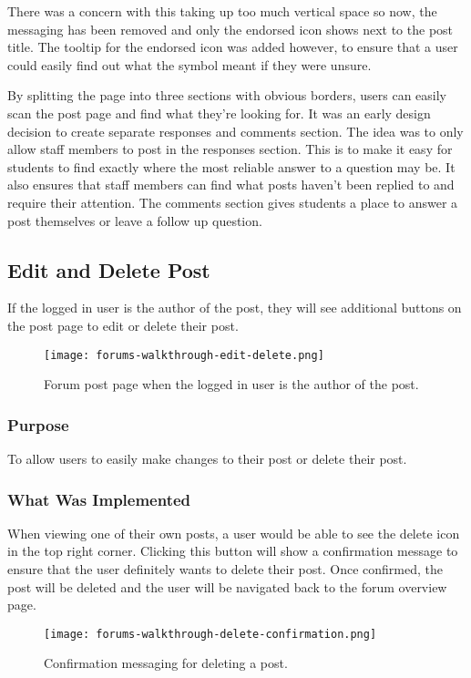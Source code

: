 There was a concern with this taking up too much vertical space so now, the messaging has been removed and only the endorsed icon shows next to the post title.
The tooltip for the endorsed icon was added however, to ensure that a user could easily find out what the symbol meant if they were unsure.

By splitting the page into three sections with obvious borders, users can easily scan the post page and find what they're looking for.
It was an early design decision to create separate responses and comments section.
The idea was to only allow staff members to post in the responses section.
This is to make it easy for students to find exactly where the most reliable answer to a question may be.
It also ensures that staff members can find what posts haven't been replied to and require their attention.
The comments section gives students a place to answer a post themselves or leave a follow up question.

\subsection{Edit and Delete Post}
If the logged in user is the author of the post, they will see additional buttons on the post page to edit or delete their post.

\begin{figure}[h!]
    \texttt{[image: forums-walkthrough-edit-delete.png]}
    \centering
    \caption{Forum post page when the logged in user is the author of the post.}
\end{figure}

\subsubsection{Purpose}
To allow users to easily make changes to their post or delete their post.

\subsubsection{What Was Implemented}
When viewing one of their own posts, a user would be able to see the delete icon in the top right corner.
Clicking this button will show a confirmation message to ensure that the user definitely wants to delete their post.
Once confirmed, the post will be deleted and the user will be navigated back to the forum overview page.

\begin{figure}[h!]
    \texttt{[image: forums-walkthrough-delete-confirmation.png]}
    \centering
    \caption{Confirmation messaging for deleting a post.}
\end{figure}


